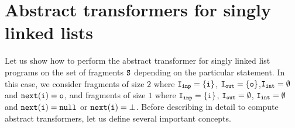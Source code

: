 \section{Abstract transformers for singly linked lists}
Let us show how to perform the abstract transformer for singly linked list programs on the set of fragments $\tt S$ depending on the particular statement. In this case, we consider fragments of size $2$ where $\tt I_{inp} = \{i\}$, $\tt I_{out} = \{o\}$,$\tt I_{int} = \emptyset$ and $\tt next(i) = o$, and fragments of size $1$ where $\tt I_{inp} = \{i\}$, $\tt I_{out} = \emptyset$, $\tt I_{int} = \emptyset$ and $\tt next(i) = null$ or $\tt next(i) = \bot$. Before describing in detail to compute abstract transformers, let us define several important concepts.


